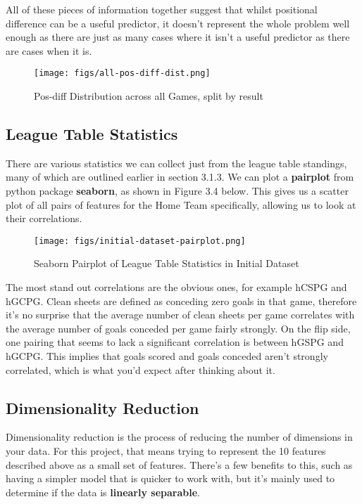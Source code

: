 \documentclass[12pt,a4paper,twoside,openright]{report}
\begin{document}
All of these pieces of information together suggest that whilst positional difference can be a useful predictor, it doesn't represent the whole problem well enough as there are just as many cases where it isn't a useful predictor as there are cases when it is.

\begin{figure}[h]
  \texttt{[image: figs/all-pos-diff-dist.png]}
  \caption{Pos-diff Distribution across all Games, split by result}
  \label{fig:all-pos-diff-dist}
\end{figure}

\subsection{League Table Statistics}

There are various statistics we can collect just from the league table standings, many of which are outlined earlier in section 3.1.3. We can plot a \textbf{pairplot} from python package \textbf{seaborn}, as shown in Figure 3.4 below. This gives us a scatter plot of all pairs of features for the Home Team specifically, allowing us to look at their correlations.

\begin{figure}[h]
  \centering
  \texttt{[image: figs/initial-dataset-pairplot.png]}
  \caption{Seaborn Pairplot of League Table Statistics in Initial Dataset}
  \label{fig:initial-dataset-pairplot}
\end{figure}

The most stand out correlations are the obvious ones, for example hCSPG and hGCPG. Clean sheets are defined as conceding zero goals in that game, therefore it's no surprise that the average number of clean sheets per game correlates with the average number of goals conceded per game fairly strongly. On the flip side, one pairing that seems to lack a significant correlation is between hGSPG and hGCPG. This implies that goals scored and goals conceded aren't strongly correlated, which is what you'd expect after thinking about it.

\subsection{Dimensionality Reduction}

Dimensionality reduction is the process of reducing the number of dimensions in your data. For this project, that means trying to represent the 10 features described above as a small set of features. There's a few benefits to this, such as having a simpler model that is quicker to work with, but it's mainly used to determine if the data is \textbf{linearly separable}. 
\end{document}
